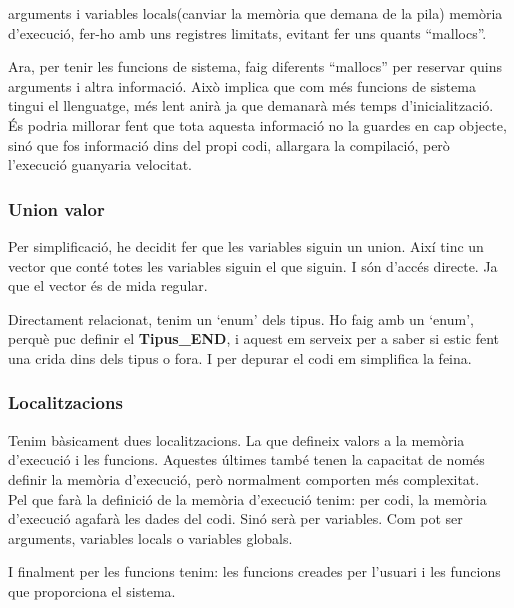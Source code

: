 arguments i variables locals(canviar la memòria que demana de la pila)
memòria d'execució, fer-ho amb uns registres limitats, evitant fer uns quants ``mallocs''.

Ara, per tenir les funcions de sistema, faig diferents ``mallocs'' per reservar quins arguments
i altra informació. Això implica que com més funcions de sistema tingui el llenguatge, més lent anirà ja que
demanarà més temps d'inicialització.
És podria millorar fent que tota aquesta informació no la guardes en cap objecte,
sinó que fos informació dins del propi codi, allargara la compilació, però l'execució guanyaria velocitat.

\subsubsection{Union valor}
Per simplificació, he decidit fer que les variables siguin un union.
Així tinc un vector que conté totes les variables siguin el que siguin.
I són d'accés directe. Ja que el vector és de mida regular.

Directament relacionat, tenim un `enum' dels tipus.
Ho faig amb un `enum', perquè puc definir el \textbf{Tipus\_END},
i aquest em serveix per a saber si estic fent una crida dins dels tipus o fora.
I per depurar el codi em simplifica la feina.

\subsubsection{Localitzacions}
Tenim bàsicament dues localitzacions.
La que defineix valors a la memòria d'execució i les funcions.
Aquestes últimes també tenen la capacitat de només definir la memòria d'execució,
però normalment comporten més complexitat.\\

Pel que farà la definició de la memòria d'execució tenim:
per codi, la memòria d'execució agafarà les dades del codi.
Sinó serà per variables. Com pot ser arguments, variables locals o
variables globals.

I finalment per les funcions tenim:
les funcions creades per l'usuari i
les funcions que proporciona el sistema.